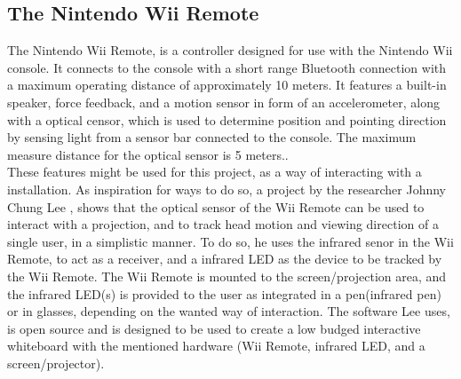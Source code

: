 \subsection{The Nintendo Wii Remote } %
The Nintendo Wii Remote, is a controller designed for use with the Nintendo Wii console. It connects to the console with a short range Bluetooth connection with a maximum operating distance of approximately 10 meters\cite{WiimoteWIKI}\cite{WiimoteSpecs}. It features a built-in speaker, force feedback, and a motion sensor in form of an accelerometer, along with a optical censor, which is used to determine position and pointing direction by sensing light from a sensor bar connected to the console. The maximum measure distance for the optical sensor is 5 meters.\cite{WiimoteWIKI}. \\
These features might be used for this project, as a way of interacting with a installation. As inspiration for ways to do so, a project by the researcher Johnny Chung Lee \cite{JohnnyLeeWiiMoteDemo}, shows that the optical sensor of the Wii Remote can be used to interact with a projection, and to track head motion and viewing direction of a single user, in a simplistic manner. To do so, he uses the infrared senor in the Wii Remote, to act as a receiver, and a infrared LED as the device to be tracked by the Wii Remote. The Wii Remote is mounted to the screen/projection area, and the infrared LED(s) is provided to the user as integrated in a pen(infrared pen) or in glasses, depending on the wanted way of interaction. The software Lee uses, is open source and is designed to be used to create a low budged interactive whiteboard with the mentioned hardware (Wii Remote, infrared LED, and a screen/projector)\cite{JohnnyLeeWiiMProgram}.

